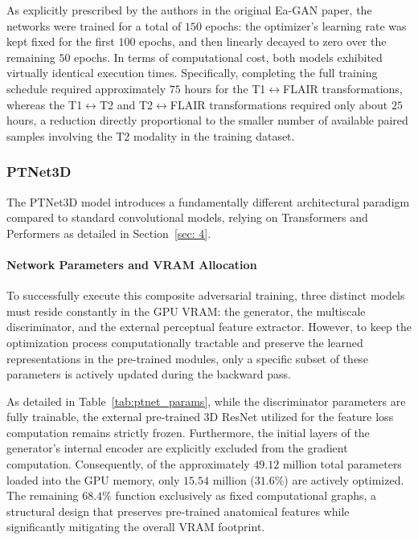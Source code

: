 \documentclass[11pt,a4paper]{article}
\begin{document}
As explicitly prescribed by the authors in the original Ea-GAN paper, the networks were trained for a total of $150$ epochs: the optimizer's learning rate was kept fixed for the first $100$ epochs, and then linearly decayed to zero over the remaining $50$ epochs. In terms of computational cost, both models exhibited virtually identical execution times. Specifically, completing the full training schedule required approximately $75$ hours for the T1$\leftrightarrow$FLAIR transformations, whereas the T1$\leftrightarrow$T2 and T2$\leftrightarrow$FLAIR transformations required only about $25$ hours, a reduction directly proportional to the smaller number of available paired samples involving the T2 modality in the training dataset.

\subsubsection{PTNet3D}

The PTNet3D model introduces a fundamentally different architectural paradigm compared to standard convolutional models, relying on Transformers and Performers as detailed in Section~\ref{sec: 4}.

\paragraph{Network Parameters and VRAM Allocation}
To successfully execute this composite adversarial training, three distinct models must reside constantly in the GPU VRAM: the generator, the multiscale discriminator, and the external perceptual feature extractor. However, to keep the optimization process computationally tractable and preserve the learned representations in the pre-trained modules, only a specific subset of these parameters is actively updated during the backward pass. 

As detailed in Table~\ref{tab:ptnet_params}, while the discriminator parameters are fully trainable, the external pre-trained 3D ResNet utilized for the feature loss computation remains strictly frozen. Furthermore, the initial layers of the generator's internal encoder are explicitly excluded from the gradient computation. Consequently, of the approximately $49.12$ million total parameters loaded into the GPU memory, only $15.54$ million ($31.6\%$) are actively optimized. The remaining $68.4\%$ function exclusively as fixed computational graphs, a structural design that preserves pre-trained anatomical features while significantly mitigating the overall VRAM footprint.
\end{document}

